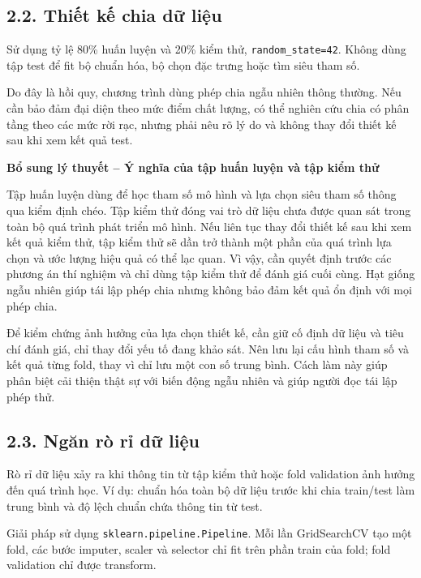 \documentclass[12pt,a4paper,oneside]{article}
\begin{document}
\subsection*{2.2. Thiết kế chia dữ liệu}

Sử dụng tỷ lệ 80\% huấn luyện và 20\% kiểm thử,
\texttt{random\_state=42}. Không dùng tập test để fit bộ chuẩn hóa, bộ
chọn đặc trưng hoặc tìm siêu tham số.

Do đây là hồi quy, chương trình dùng phép chia ngẫu nhiên thông thường.
Nếu cần bảo đảm đại diện theo mức điểm chất lượng, có thể nghiên cứu
chia có phân tầng theo các mức rời rạc, nhưng phải nêu rõ lý do và không
thay đổi thiết kế sau khi xem kết quả test.


\par\noindent\textbf{Bổ sung lý thuyết -- Ý nghĩa của tập huấn luyện và tập kiểm thử}\par
Tập huấn luyện dùng để học tham số mô hình và lựa chọn siêu tham số thông qua kiểm định chéo. Tập kiểm thử đóng vai trò dữ liệu chưa được quan sát trong toàn bộ quá trình phát triển mô hình. Nếu liên tục thay đổi thiết kế sau khi xem kết quả kiểm thử, tập kiểm thử sẽ dần trở thành một phần của quá trình lựa chọn và ước lượng hiệu quả có thể lạc quan. Vì vậy, cần quyết định trước các phương án thí nghiệm và chỉ dùng tập kiểm thử để đánh giá cuối cùng. Hạt giống ngẫu nhiên giúp tái lập phép chia nhưng không bảo đảm kết quả ổn định với mọi phép chia.\par

Để kiểm chứng ảnh hưởng của lựa chọn thiết kế, cần giữ cố định dữ liệu và tiêu chí đánh giá, chỉ thay đổi yếu tố đang khảo sát. Nên lưu lại cấu hình tham số và kết quả từng fold, thay vì chỉ lưu một con số trung bình. Cách làm này giúp phân biệt cải thiện thật sự với biến động ngẫu nhiên và giúp người đọc tái lập phép thử.\par

\subsection*{2.3. Ngăn rò rỉ dữ liệu}

Rò rỉ dữ liệu xảy ra khi thông tin từ tập kiểm thử hoặc fold validation
ảnh hưởng đến quá trình học. Ví dụ: chuẩn hóa toàn bộ dữ liệu trước khi
chia train/test làm trung bình và độ lệch chuẩn chứa thông tin từ test.

Giải pháp sử dụng \texttt{sklearn.pipeline.Pipeline}. Mỗi lần
GridSearchCV tạo một fold, các bước imputer, scaler và selector chỉ fit
trên phần train của fold; fold validation chỉ được transform.
\end{document}
